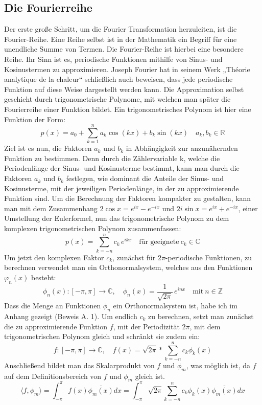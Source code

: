 \documentclass[a4paper,12pt]{article}
\theoremstyle{definition}
\theoremstyle{remark}
\begin{document}
\subsection{Die Fourierreihe}
Der erste große Schritt, um die Fourier Transformation herzuleiten, ist die Fourier-Reihe. 
Eine Reihe selbst ist in der Mathematik ein Begriff für eine unendliche Summe von Termen. 
Die Fourier-Reihe ist hierbei eine besondere Reihe. Ihr Sinn ist es, periodische Funktionen 
mithilfe von Sinus- und Kosinustermen zu approximieren. Joseph Fourier hat in seinem Werk 
„Théorie analytique de la chaleur“ schließlich auch beweisen, dass jede periodische Funktion 
auf diese Weise dargestellt werden kann. Die Approximation selbst geschieht durch 
trigonometrische Polynome, mit welchen man später die Fourierreihe einer Funktion bildet. 
Ein trigonometrisches Polynom ist hier eine Funktion der Form: 
$$p(x) = a_0 + \sum_{k=1}^n{a_k \cos(kx) + b_k \sin(kx)}  \quad a_k,b_k \in \mathbb{R}$$
Ziel ist es nun, die Faktoren $a_k$ und $b_k$ in Abhängigkeit zur anzunähernden Funktion zu 
bestimmen. Denn durch die Zählervariable k, welche die Periodenlänge der Sinus- und 
Kosinusterme bestimmt, kann man durch die Faktoren $a_k$ und $b_k$ festlegen, wie dominant 
die Anteile der Sinus- und Kosinusterme, mit der jeweiligen Periodenlänge, in der zu 
approximierende Funktion sind. Um die Berechnung der Faktoren kompakter zu gestalten, 
kann man mit dem Zusammenhang $2\cos{x} = e^{ix} -e^{-ix}$ und $2i\sin{x} = e^{ix}+e^{-ix}$, 
einer Umstellung der Eulerformel, nun das trigonometrische Polynom zu dem komplexen 
trigonometrischen Polynom zusammenfassen: 
$$p(x) = \sum_{k=-n}^n{c_k \, e^{ikx}} \quad \text{für geeignete} \: c_k \in \mathbb{C}$$
Um jetzt den komplexen Faktor $c_k$, zunächst für $2\pi$-periodische Funktionen, 
zu berechnen verwendet man ein Orthonormalsystem, welches aus den Funktionen $\varphi_n(x)$ besteht:
$$\phi_n(x):[-\pi,\pi] \to \mathbb{C}, \quad \phi_n(x) = \frac{1}{\sqrt{2\pi}} \, e^{inx} \quad \text{mit} \: n\in \mathbb{Z}$$
Dass die Menge an Funktionen $\phi_n$ ein Orthonormalsystem ist, habe 
ich im Anhang gezeigt (Beweis A. 1). Um endlich $c_k$ zu berechnen, setzt man zunächst 
die zu approximierende Funktion $f$, mit der Periodizität $2\pi$, mit dem 
trigonometrischen Polynom gleich und schränkt sie zudem ein: 
$$f:[-\pi,\pi]\to \mathbb{C},\quad f(x) = \sqrt{2\pi} * \sum_{k = -n}^n{c_k\phi_k(x)} $$
Anschließend bildet man das Skalarprodukt von $f$ und $\phi_m$, was möglich ist, da 
$f$ auf dem Definitionsbereich von $f$ und $\phi_m$ gleich ist. 
$$\langle f, \phi_m \rangle = \int_{-\pi}^\pi {f(x) \overline{\phi_m(x)}dx} = \int_{-\pi}^\pi{\sqrt{2\pi}\sum_{k = -n}^n{c_k\phi_k(x)\overline{\phi_m(x)}}dx}$$
\end{document}
